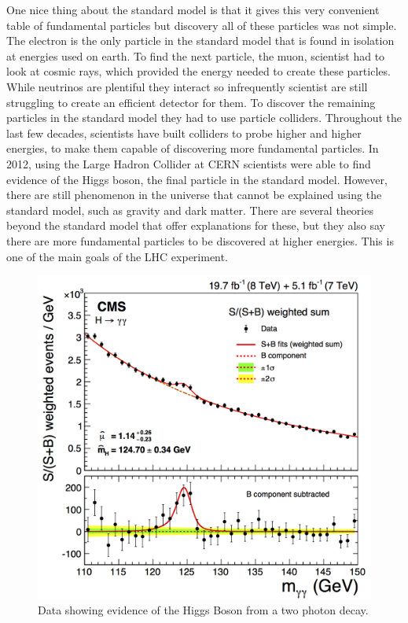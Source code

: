 One nice thing about the standard model is that it gives this very convenient table of fundamental particles but discovery all of these particles was not simple. The electron is the only particle in the standard model that is found in isolation at energies used on earth. To find the next particle, the muon, scientist had to look at cosmic rays, which provided the energy needed to create these particles. While neutrinos are plentiful they interact so infrequently scientist are still struggling to create an efficient detector for them. To discover the remaining particles in the standard model they had to use particle colliders. Throughout the last few decades, scientists have built colliders to probe higher and higher energies, to make them capable of discovering more fundamental particles. In 2012, using the Large Hadron Collider at CERN scientists were able to find evidence of the Higgs boson, the final particle in the standard model. However, there are still phenomenon in the universe that cannot be explained using the standard model, such as gravity and dark matter. There are several theories beyond the standard model that offer explanations for these, but they also say there are more fundamental particles to be discovered at higher energies. This is one of the main goals of the LHC experiment. 

\begin{figure}
\centering
\includegraphics[width=0.6\linewidth]{Figures/higgsmeasurement.png}
\caption{Data showing evidence of the Higgs Boson from a two photon decay.}
\label{fig:higgs}
\end{figure} 

